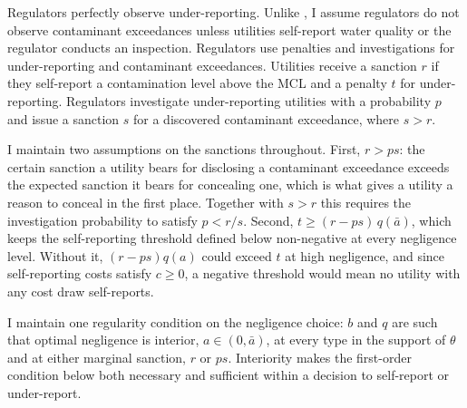 \documentclass[12pt]{article}
\begin{document}
	Regulators perfectly observe under-reporting. Unlike \textcite{mookherjee1994marginal}, I assume regulators do not observe contaminant exceedances unless utilities self-report water quality or the regulator conducts an inspection. Regulators use penalties and investigations for under-reporting and contaminant exceedances. Utilities receive a sanction $r$ if they self-report a contamination level above the MCL and a penalty $t$ for under-reporting. Regulators investigate under-reporting utilities with a probability $p$ and issue a sanction $s$ for a discovered contaminant exceedance, where $s>r$.

	I maintain two assumptions on the sanctions throughout. First, $r > ps$: the certain sanction a utility bears for disclosing a contaminant exceedance exceeds the expected sanction it bears for concealing one, which is what gives a utility a reason to conceal in the first place. Together with $s>r$ this requires the investigation probability to satisfy $p < r/s$. Second, $t \ge (r-ps)\,q(\bar{a})$, which keeps the self-reporting threshold defined below non-negative at every negligence level. Without it, $(r-ps)q(a)$ could exceed $t$ at high negligence, and since self-reporting costs satisfy $c \ge 0$, a negative threshold would mean no utility with any cost draw self-reports.

	I maintain one regularity condition on the negligence choice: $b$ and $q$ are such that optimal negligence is interior, $a \in (0,\bar{a})$, at every type in the support of $\theta$ and at either marginal sanction, $r$ or $ps$. Interiority makes the first-order condition below both necessary and sufficient within a decision to self-report or under-report.

	
\end{document}
